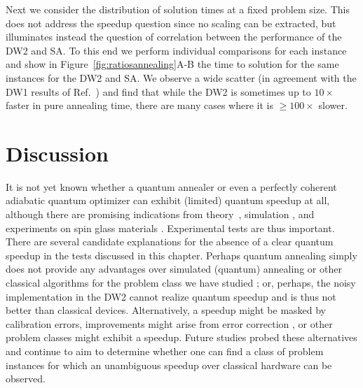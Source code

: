Next we consider the distribution of solution times at a fixed problem size. This does not address the speedup question since no scaling can be extracted, but illuminates instead the question of correlation between the performance of the DW2 and SA. To this end we perform individual comparisons for each instance and show in Figure~\ref{fig:ratiosannealing}A-B the time to solution for the same instances for the DW2 and SA. We observe a wide scatter (in agreement with the DW1 results of Ref.~\cite{q108}) and find that while the DW2 is sometimes up to $10\times$ faster in pure annealing time, there are many cases where it is $\geq 100\times$ slower.

\section{Discussion}

It is not yet known whether a quantum annealer or even a perfectly coherent adiabatic quantum optimizer can exhibit (limited) quantum speedup at all, although there are promising indications from theory~\cite{Somma:2012kx}, simulation \cite{Santoro}, and experiments on spin glass materials \cite{Brooke1999}. Experimental tests are thus important.
There are several candidate explanations for the absence of a clear quantum speedup in the tests discussed in this chapter. Perhaps quantum annealing simply does not provide any advantages over simulated (quantum) annealing or other classical algorithms for the problem class we have studied \cite{2014Katzgraber}; or, perhaps, the noisy implementation in the DW2 cannot realize quantum speedup and is thus not better than classical devices. Alternatively, a speedup might be masked by calibration errors, improvements might arise from error correction \cite{PAL:13}, or other problem classes might exhibit a speedup. Future studies probed these alternatives and continue to aim to determine whether one can find a class of problem instances for which an unambiguous speedup over classical hardware can be observed.

